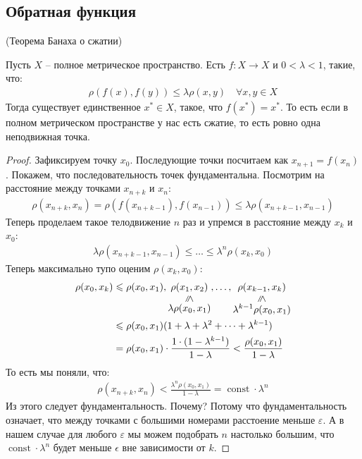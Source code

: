 \subsection{Обратная функция}
\begin{theorem} (Теорема Банаха о сжатии)

    Пусть $X$ -- полное метрическое пространство. Есть $f: X \longrightarrow X$ и $0 < \lambda < 1$, такие, что:
    \begin{gather*}
        \rho(f(x), f(y)) \leqslant \lambda \rho(x, y) \quad \forall x, y \in X
    \end{gather*}
    Тогда существует единственное $x^* \in X$, такое, что $f(x^*) = x^*$. 
    То есть если в полном метрическом пространстве у нас есть сжатие, то есть ровно одна неподвижная точка. 
\end{theorem}
\begin{proof}
    Зафиксируем точку $x_0$. Последующие точки посчитаем как $x_{n+1} = f(x_n)$. 
    Покажем, что последовательность точек фундаментальна. Посмотрим на расстояние между точками $x_{n+k}$ и $x_{n}$:
    \begin{gather*}
        \rho(x_{n+k}, x_n) = \rho(f(x_{n+k-1}), f(x_{n-1})) \leqslant \lambda \rho(x_{n+k-1}, x_{n-1})
    \end{gather*}
    Теперь проделаем такое телодвижение $n$ раз и упремся в расстояние между $x_k$ и $x_0$:
    \begin{gather*}
        \lambda \rho(x_{n+k-1}, x_{n-1}) \leqslant \dots \leqslant \lambda^n \rho(x_k, x_0)
    \end{gather*}
    Теперь максимально тупо оценим $\rho(x_k, x_0)$: 
    \begin{align*}
        \rho(x_0, x_k) &\leqslant \rho(x_0, x_1), \lessbelow{\rho(x_1, x_2)}{\lambda \rho(x_0, x_1)}, \dots, \lessbelow{\rho(x_{k-1}, x_k)}{\lambda^{k-1} \rho(x_0, x_1)} \\
        &\leqslant \rho(x_0, x_1) (1 + \lambda + \lambda^2 + \dots + \lambda^{k-1}) \\
        &= \rho(x_0, x_1) \cdot \frac{1 \cdot (1 - \lambda^{k-1})}{1 - \lambda} < \frac{\rho(x_0, x_1)}{1 - \lambda}
    \end{align*}
    То есть мы поняли, что:
    \begin{gather*}
        \rho(x_{n+k}, x_n) < \frac{\lambda^n \rho(x_0, x_1)}{1 - \lambda} = \operatorname{const} \cdot \lambda^n
    \end{gather*}
    Из этого следует фундаментальность. Почему? Потому что фундаментальность означает, что между точками с большими номерами расстоение 
    меньше $\varepsilon$. А в нашем случае для любого $\varepsilon$ мы можем подобрать $n$ настолько большим, 
    что $\operatorname{const} \cdot \lambda^n$ будет меньше $\epsilon$ вне зависимости от $k$.


\end{proof}

